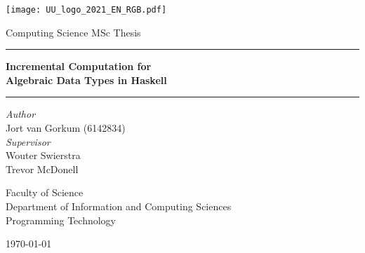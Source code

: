 \begin{titlepage}
  \fontsize{12pt}{15pt}\selectfont
  \begin{center}
    \vspace*{\fill}
    \texttt{[image: UU\_logo\_2021\_EN\_RGB.pdf]}

    \vspace{1.25cm}

    Computing Science MSc Thesis

    \vspace{1cm}

    \hrule
    \vspace{0.4cm}
    {
      \fontsize{20.74pt}{20.74pt}\selectfont
      \parbox[]{13cm} {
        \centering
        \textbf{Incremental Computation for \\ Algebraic Data Types in Haskell}
      }
    }
    \vspace{0.5cm}
    \hrule
      
    \vspace{2.5cm}
    
    \begin{multicols}{2}
      \textit{Author} \\
      Jort van Gorkum (6142834) \\
    \columnbreak
      \textit{Supervisor} \\
      Wouter Swierstra \\
      Trevor McDonell \\
    \end{multicols}

    
    \vspace{2.5cm}

    Faculty of Science \\
    Department of Information and Computing Sciences \\
    Programming Technology \\
    
    \vspace{1.5cm}

    \monthyeardate\today
  \end{center}
\end{titlepage}